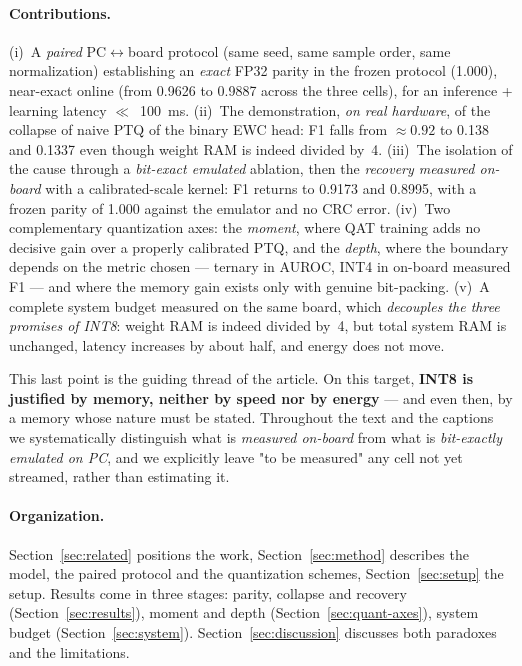 \paragraph{Contributions.} (i)~A \emph{paired} PC$\leftrightarrow$board protocol (same seed, same sample
order, same normalization) establishing an \emph{exact} FP32 parity in the frozen protocol (\num{1.000}),
near-exact online (from \num{0.9626} to \num{0.9887} across the three cells), for an inference + learning
latency
$\ll$~\SI{100}{\milli\second}. (ii)~The demonstration, \emph{on real hardware}, of the collapse of naive
\gls{PTQ} of the binary EWC head: F1 falls from $\approx\!\num{0.92}$ to \num{0.138} and \num{0.1337} even
though weight \gls{RAM} is indeed divided by~4. (iii)~The isolation of the cause through a \emph{bit-exact
emulated} ablation, then the \emph{recovery measured on-board} with a calibrated-scale kernel: F1 returns
to \num{0.9173} and \num{0.8995}, with a frozen parity of \num{1.000} against the emulator and no \gls{CRC}
error. (iv)~Two complementary quantization axes: the \emph{moment}, where \gls{QAT} training adds no decisive
gain over a properly calibrated PTQ, and the \emph{depth}, where the boundary depends on the metric chosen
--- ternary in AUROC, INT4 in on-board measured F1 --- and where the memory gain exists only with genuine
bit-packing. (v)~A complete system budget measured on the same
board, which \emph{decouples the three promises of INT8}: weight RAM is indeed divided by~4, but total
system RAM is unchanged, latency increases by about half, and energy does not move.

This last point is the guiding thread of the article. On this target, \textbf{INT8 is justified by memory,
neither by speed nor by energy} --- and even then, by a memory whose nature must be stated. Throughout the
text and the captions we systematically distinguish what is \emph{measured on-board} from what is
\emph{bit-exactly emulated on PC}, and we explicitly leave "to be measured" any cell not yet streamed,
rather than estimating it.

\paragraph{Organization.} Section~\ref{sec:related} positions the work, Section~\ref{sec:method} describes
the model, the paired protocol and the quantization schemes, Section~\ref{sec:setup} the setup. Results
come in three stages: parity, collapse and recovery (Section~\ref{sec:results}), moment and depth
(Section~\ref{sec:quant-axes}), system budget (Section~\ref{sec:system}). Section~\ref{sec:discussion}
discusses both paradoxes and the limitations.

